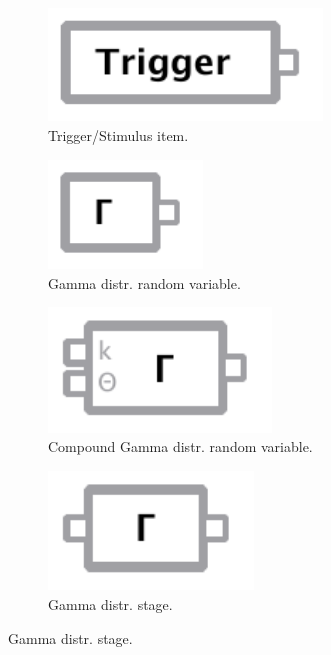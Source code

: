 \begin{figure}[!ht]
 \begin{subfigure}[c]{0.2\textwidth}
   \centering
 	\includegraphics[width=0.8\textwidth]{fig/guitrigger.pdf}
 	\caption{Trigger/Stimulus item.} \label{fig:itemtrigger}
 \end{subfigure}\hfill
 \begin{subfigure}[c]{0.2\textwidth}
   \centering
 	\includegraphics[width=0.45\textwidth]{fig/guigamma.pdf}
 	\caption{Gamma distr. random variable.} \label{fig:itemgamma}
 \end{subfigure}\hfill
 \begin{subfigure}[c]{0.2\textwidth}
   \centering
 	\includegraphics[width=0.65\textwidth]{fig/guigammac.pdf}
 	\caption{Compound Gamma distr. random variable.} \label{fig:itemgammac}
 \end{subfigure} \hfill
 \begin{subfigure}[c]{0.2\textwidth}
   \centering
 	\includegraphics[width=0.6\textwidth]{fig/guigammap.pdf}
 	\caption{Gamma distr. stage.} \label{fig:itemgammap}
 \end{subfigure}
 

\end{figure}
